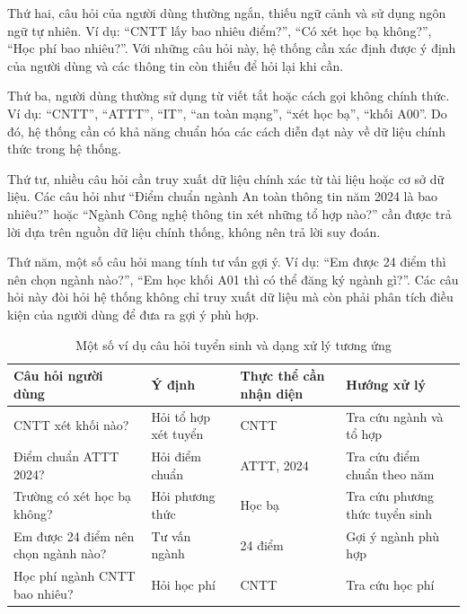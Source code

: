 \documentclass[12pt,a4paper]{report}
\begin{document}
Thứ hai, câu hỏi của người dùng thường ngắn, thiếu ngữ cảnh và sử dụng ngôn ngữ tự nhiên. Ví dụ: ``CNTT lấy bao nhiêu điểm?'', ``Có xét học bạ không?'', ``Học phí bao nhiêu?''. Với những câu hỏi này, hệ thống cần xác định được ý định của người dùng và các thông tin còn thiếu để hỏi lại khi cần.

Thứ ba, người dùng thường sử dụng từ viết tắt hoặc cách gọi không chính thức. Ví dụ: ``CNTT'', ``ATTT'', ``IT'', ``an toàn mạng'', ``xét học bạ'', ``khối A00''. Do đó, hệ thống cần có khả năng chuẩn hóa các cách diễn đạt này về dữ liệu chính thức trong hệ thống.

Thứ tư, nhiều câu hỏi cần truy xuất dữ liệu chính xác từ tài liệu hoặc cơ sở dữ liệu. Các câu hỏi như ``Điểm chuẩn ngành An toàn thông tin năm 2024 là bao nhiêu?'' hoặc ``Ngành Công nghệ thông tin xét những tổ hợp nào?'' cần được trả lời dựa trên nguồn dữ liệu chính thống, không nên trả lời suy đoán.

Thứ năm, một số câu hỏi mang tính tư vấn gợi ý. Ví dụ: ``Em được 24 điểm thì nên chọn ngành nào?'', ``Em học khối A01 thì có thể đăng ký ngành gì?''. Các câu hỏi này đòi hỏi hệ thống không chỉ truy xuất dữ liệu mà còn phải phân tích điều kiện của người dùng để đưa ra gợi ý phù hợp.

\begin{table}[H]
    \centering
    \caption{Một số ví dụ câu hỏi tuyển sinh và dạng xử lý tương ứng}
    \label{tab:admission_question_examples}
    \begin{tabular}{|p{4.1cm}|p{3.2cm}|p{3.1cm}|p{3.8cm}|}
        \hline
        \textbf{Câu hỏi người dùng} & \textbf{Ý định} & \textbf{Thực thể cần nhận diện} & \textbf{Hướng xử lý} \\ \hline
        CNTT xét khối nào? & Hỏi tổ hợp xét tuyển & CNTT & Tra cứu ngành và tổ hợp \\ \hline
        Điểm chuẩn ATTT 2024? & Hỏi điểm chuẩn & ATTT, 2024 & Tra cứu điểm chuẩn theo năm \\ \hline
        Trường có xét học bạ không? & Hỏi phương thức & Học bạ & Tra cứu phương thức tuyển sinh \\ \hline
        Em được 24 điểm nên chọn ngành nào? & Tư vấn ngành & 24 điểm & Gợi ý ngành phù hợp \\ \hline
        Học phí ngành CNTT bao nhiêu? & Hỏi học phí & CNTT & Tra cứu học phí \\ \hline
    \end{tabular}
\end{table}
\end{document}
